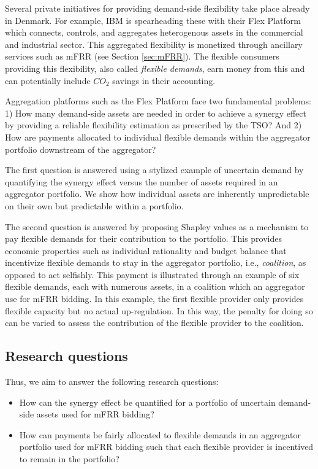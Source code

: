 \documentclass[lettersize,journal]{IEEEtran}
\begin{document}
Several private initiatives for providing demand-side flexibility take place already in Denmark. For example, IBM is spearheading these with their Flex Platform which connects, controls, and aggregates heterogenous assets in the commercial and industrial sector. This aggregated flexibility is monetized through ancillary services such as mFRR (see Section \ref{sec:mFRR}). The flexible consumers providing this flexibility, also called \textit{flexible demands}, earn money from this and can potentially include $CO_{2}$ savings in their accounting.

Aggregation platforms such as the Flex Platform face two fundamental problems: 1) How many demand-side assets are needed in order to achieve a synergy effect by providing a reliable flexibility estimation as prescribed by the TSO? And 2) How are payments allocated to individual flexible demands within the aggregator portfolio downstream of the aggregator?

The first question is answered using a stylized example of uncertain demand by quantifying the synergy effect versus the number of assets required in an aggregator portfolio. We show how individual assets are inherently unpredictable on their own but predictable within a portfolio.

The second question is answered by proposing Shapley values \cite{shapley1997value} as a mechanism to pay flexible demands for their contribution to the portfolio. This provides economic properties such as individual rationality and budget balance that incentivize flexible demands to stay in the aggregator portfolio, i.e., \textit{coalition}, as opposed to act selfishly. This payment is illustrated through an example of six flexible demands, each with numerous assets, in a coalition which an aggregator use for mFRR bidding. In this example, the first flexible provider only provides flexible capacity but no actual up-regulation. In this way, the penalty for doing so can be varied to assess the contribution of the flexible provider to the coalition.

\IEEEpubidadjcol

\subsection{Research questions}

Thus, we aim to answer the following research questions:

\begin{itemize}
    \item How can the synergy effect be quantified for a portfolio of uncertain demand-side assets used for mFRR bidding?
    \item How can payments be fairly allocated to flexible demands in an aggregator portfolio used for mFRR bidding such that each flexible provider is incentived to remain in the portfolio?
\end{itemize}
\end{document}
